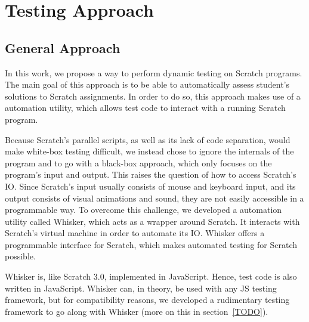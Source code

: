 
\chapter{Testing Approach}


\section{General Approach}

In this work, we propose a way to perform dynamic testing on Scratch programs.
The main goal of this approach is to be able to automatically assess student's solutions to Scratch assignments.
In order to do so, this approach makes use of a automation utility, which allows test code to interact with a running Scratch program.
\parspace

Because Scratch's parallel scripts, as well as its lack of code separation, would make white-box testing difficult,
we instead chose to ignore the internals of the program and to go with a black-box approach, which only focuses on the program's input and output.
This raises the question of how to access Scratch's IO.
Since Scratch's input usually consists of mouse and keyboard input, and its output consists of visual animations and sound,
they are not easily accessible in a programmable way.
To overcome this challenge, we developed a automation utility called Whisker, which acts as a wrapper around Scratch.
It interacts with Scratch's virtual machine in order to automate its IO.
Whisker offers a programmable interface for Scratch, which makes automated testing for Scratch possible.
\parspace

Whisker is, like Scratch 3.0, implemented in JavaScript.
Hence, test code is also written in JavaScript.
Whisker can, in theory, be used with any JS testing framework,
but for compatibility reasons, we developed a rudimentary testing framework to go along with Whisker (more on this in section~\ref{TODO}).




